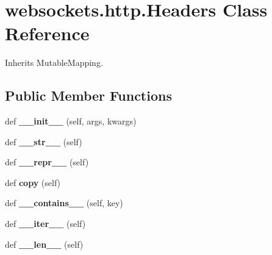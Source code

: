 \hypertarget{classwebsockets_1_1http_1_1_headers}{}\section{websockets.\+http.\+Headers Class Reference}
\label{classwebsockets_1_1http_1_1_headers}


Inherits Mutable\+Mapping.

\subsection*{Public Member Functions}
\begin{DoxyCompactItemize}
\item 
\mbox{\label{classwebsockets_1_1http_1_1_headers_adec466c1b6bc0fc30648963563acf0b6}} 
def {\bfseries \+\_\+\+\_\+init\+\_\+\+\_\+} (self, args, kwargs)
\item 
\mbox{\label{classwebsockets_1_1http_1_1_headers_af5ffcf8dabd04f868386026b1c26750e}} 
def {\bfseries \+\_\+\+\_\+str\+\_\+\+\_\+} (self)
\item 
\mbox{\label{classwebsockets_1_1http_1_1_headers_ab224335048101275b5f4bfd917bed835}} 
def {\bfseries \+\_\+\+\_\+repr\+\_\+\+\_\+} (self)
\item 
\mbox{\label{classwebsockets_1_1http_1_1_headers_ab188cdc172e6a5e04a397b65914b3728}} 
def {\bfseries copy} (self)
\item 
\mbox{\label{classwebsockets_1_1http_1_1_headers_ab9f28be4394631d6688fec71596875f9}} 
def {\bfseries \+\_\+\+\_\+contains\+\_\+\+\_\+} (self, key)
\item 
\mbox{\label{classwebsockets_1_1http_1_1_headers_a7ff870ea3a409a216cd2821f011c1056}} 
def {\bfseries \+\_\+\+\_\+iter\+\_\+\+\_\+} (self)
\item 
\mbox{\label{classwebsockets_1_1http_1_1_headers_a5f23487c8c5ab8602e0109ec918f0536}} 
def {\bfseries \+\_\+\+\_\+len\+\_\+\+\_\+} (self)

\end{DoxyCompactItemize}
